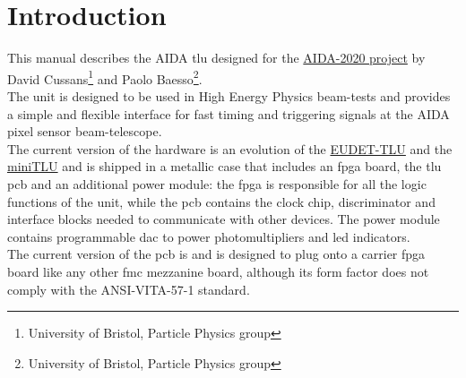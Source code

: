 \chapter{Introduction}\label{ch:introduction}
This manual describes the AIDA \gls{tlu} designed for the \href{http://aida2020.web.cern.ch/}{AIDA-2020 project} by David Cussans\footnote{University of Bristol, Particle Physics group} and Paolo Baesso\footnote{University of Bristol, Particle Physics group}.\\
The unit is designed to be used in High Energy Physics beam-tests and provides a simple and flexible interface for fast timing and triggering signals at the AIDA pixel sensor beam-telescope.\\
The current version of the hardware is an evolution of the \href{https://twiki.cern.ch/twiki/bin/view/MimosaTelescope/TLU}{EUDET-TLU} and the \href{https://www.ohwr.org/projects/fmc-mtlu/wiki}{miniTLU} and is shipped in a metallic case that includes an \gls{fpga} board, the \gls{tlu} \gls{pcb} and an additional power module: the \gls{fpga} is responsible for all the logic functions of the unit, while the \gls{pcb} contains the clock chip, discriminator and interface blocks needed to communicate with other devices. The power module contains programmable \gls{dac} to power photomultipliers and \gls{led} indicators.\\
The current version of the \gls{pcb} is \brd and is designed to plug onto a carrier \gls{fpga} board like any other \gls{fmc} mezzanine board, although its form factor does not comply with the ANSI-VITA-57-1 standard.\\

